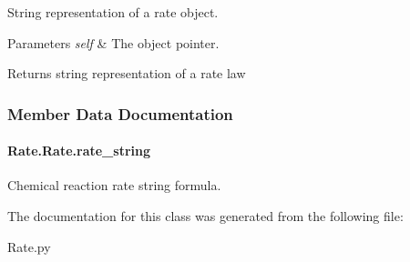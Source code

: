 String representation of a rate object. 


\begin{DoxyParams}{Parameters}
{\em self} & The object pointer. \\
\hline
\end{DoxyParams}
\begin{DoxyReturn}{Returns}
string representation of a rate law 
\end{DoxyReturn}


\subsubsection{Member Data Documentation}
\paragraph[{\texorpdfstring{rate\+\_\+string}{rate_string}}]{\setlength{\rightskip}{0pt plus 5cm}Rate.\+Rate.\+rate\+\_\+string}\hypertarget{classRate_1_1Rate_ae2f23006afbfa7ac885215361e3c4f49}{}\label{classRate_1_1Rate_ae2f23006afbfa7ac885215361e3c4f49}


Chemical reaction rate string formula. 



The documentation for this class was generated from the following file\+:\begin{DoxyCompactItemize}
\item 
Rate.\+py\end{DoxyCompactItemize}
